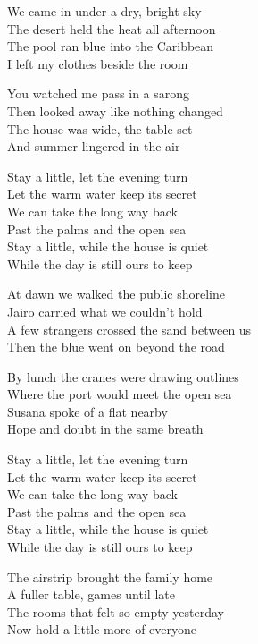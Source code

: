 \begin{lyrics}
We came in under a dry, bright sky\\
The desert held the heat all afternoon\\
The pool ran blue into the Caribbean\\
I left my clothes beside the room

You watched me pass in a sarong\\
Then looked away like nothing changed\\
The house was wide, the table set\\
And summer lingered in the air

Stay a little, let the evening turn\\
Let the warm water keep its secret\\
We can take the long way back\\
Past the palms and the open sea\\
Stay a little, while the house is quiet\\
While the day is still ours to keep

At dawn we walked the public shoreline\\
Jairo carried what we couldn’t hold\\
A few strangers crossed the sand between us\\
Then the blue went on beyond the road

By lunch the cranes were drawing outlines\\
Where the port would meet the open sea\\
Susana spoke of a flat nearby\\
Hope and doubt in the same breath

Stay a little, let the evening turn\\
Let the warm water keep its secret\\
We can take the long way back\\
Past the palms and the open sea\\
Stay a little, while the house is quiet\\
While the day is still ours to keep

The airstrip brought the family home\\
A fuller table, games until late\\
The rooms that felt so empty yesterday\\
Now hold a little more of everyone


\end{lyrics}
